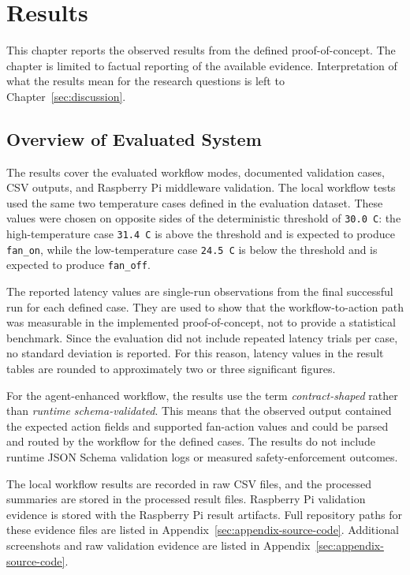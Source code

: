 \section{Results}\label{sec:results}

This chapter reports the observed results from the defined proof-of-concept. The chapter is limited to factual reporting of the available evidence. Interpretation of what the results mean for the research questions is left to Chapter~\ref{sec:discussion}.

\subsection{Overview of Evaluated System}\label{subsec:results-overview}

The results cover the evaluated workflow modes, documented validation cases, CSV outputs, and Raspberry Pi middleware validation. The local workflow tests used the same two temperature cases defined in the evaluation dataset. These values were chosen on opposite sides of the deterministic threshold of \texttt{30.0 C}: the high-temperature case \texttt{31.4 C} is above the threshold and is expected to produce \texttt{fan\_on}, while the low-temperature case \texttt{24.5 C} is below the threshold and is expected to produce \texttt{fan\_off}.

The reported latency values are single-run observations from the final successful run for each defined case. They are used to show that the workflow-to-action path was measurable in the implemented proof-of-concept, not to provide a statistical benchmark. Since the evaluation did not include repeated latency trials per case, no standard deviation is reported. For this reason, latency values in the result tables are rounded to approximately two or three significant figures.

For the agent-enhanced workflow, the results use the term \emph{contract-shaped} rather than \emph{runtime schema-validated}. This means that the observed output contained the expected action fields and supported fan-action values and could be parsed and routed by the workflow for the defined cases. The results do not include runtime JSON Schema validation logs or measured safety-enforcement outcomes.

The local workflow results are recorded in raw CSV files, and the processed summaries are stored in the processed result files. Raspberry Pi validation evidence is stored with the Raspberry Pi result artifacts. Full repository paths for these evidence files are listed in Appendix~\ref{sec:appendix-source-code}. Additional screenshots and raw validation evidence are listed in Appendix~\ref{sec:appendix-source-code}.

